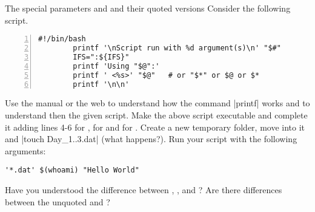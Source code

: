 
\begin{exercise}[DodgerBlue]{The special parameters \bash{*} and \bash{\@} and their quoted versions}
    Consider the following script.
    \begin{lstlisting}[style=MyBash, numbers=left]
        #!/bin/bash
        printf '\nScript run with %d argument(s)\n' "$#"
        IFS=":${IFS}"
        printf 'Using "$@":'
        printf ' <%s>' "$@"   # or "$*" or $@ or $*
        printf '\n\n'
    \end{lstlisting}
    Use the manual or the web to understand how the command \bash|printf| works and to understand then the given script.
    Make the above script executable and complete it adding lines 4-6 for , for  and for \bash{$*}.
    Create a new temporary folder, move into it and \bash|touch Day_{1..3}.dat| (what happens?).
    Run your script with the following arguments:
    \begin{lstlisting}[style=MyBash]
        '*.dat' $(whoami) "Hello World"
    \end{lstlisting}
    Have you understood the difference between , ,  and \bash{$*}?
    Are there differences between the unquoted  and \bash{$*}?
\end{exercise}
